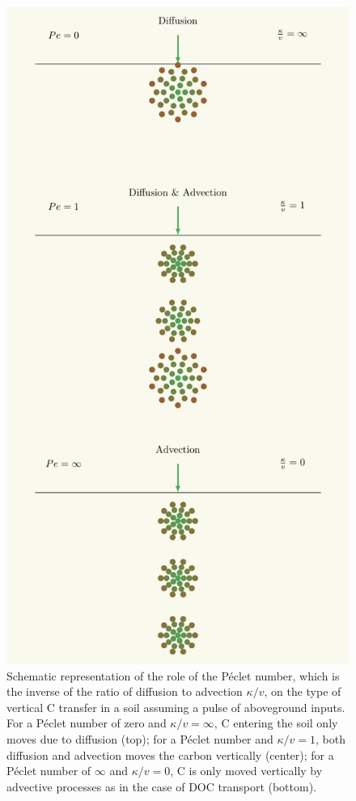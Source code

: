 \documentclass[11pt, oneside, a4paper]{article}   	%
\begin{document}
\begin{figure}[h]
   \centering
   \includegraphics[scale=0.8]{Figures/AdvectionDiffusion.pdf} %
   \caption{Schematic representation of the role of the Péclet number, which is the inverse of the ratio of diffusion to advection $\kappa/v$, on the type of vertical C transfer in a soil assuming a pulse of aboveground inputs. For a Péclet number of zero and $\kappa/v = \infty$, C entering the soil only moves due to diffusion (top); for a Péclet number and $\kappa/v = 1$, both diffusion and advection moves the carbon vertically (center); for a Péclet number of $\infty$ and $\kappa/v = 0$, C is only moved vertically by advective processes as in the case of DOC transport (bottom). }
   \label{fig:Peclet}
\end{figure}
\end{document}
